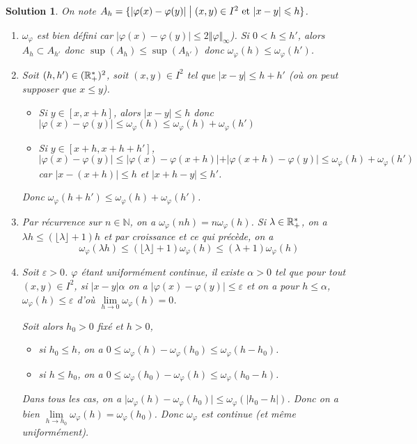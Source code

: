 \documentclass[12pt]{article}
\newtheorem{solution}{Solution}[section]
\theoremstyle{remark}
\newcommand{\N}{\mathbb{N}} \newcommand{\Z}{\mathbb{Z}}
\begin{document}
\begin{solution}
	On note $A_{h}=\{\vert\varphi(x)-\varphi(y)\vert\bigm|(x,y)\in I^{2}\text{ et }\vert x-y\vert\leqslant h\}$.
	\begin{enumerate}
		\item $\omega_{\varphi}$ est bien défini car $\vert\varphi(x)-\varphi(y)\vert\leqslant 2\Vert\varphi\Vert_{\infty}$). Si $0<h\leqslant h'$, alors $A_{h}\subset A_{h'}$ donc $\sup(A_{h})\leqslant\sup(A_{h'})$ donc $\omega_{\varphi}(h)\leqslant\omega_{\varphi}(h')$.
		\item Soit $(h,h')\in(\mathbb{R}_{+}^{*})^{2}$, soit $(x,y)\in I^{2}$ tel que $\vert x-y\vert\leqslant h+h'$ (où on peut supposer que $x\leqslant y$).
		\begin{itemize}
			\item Si $y\in[x,x+h]$, alors $\vert x-y\vert\leqslant h$ donc $\vert\varphi(x)-\varphi(y)\vert\leqslant\omega_{\varphi}(h)\leqslant\omega_\varphi(h)+\omega_{\varphi}(h')$
			\item Si $y\in[x+h,x+h+h']$, $\vert\varphi(x)-\varphi(y)\vert\leqslant\vert\varphi(x)-\varphi(x+h)\vert+\vert\varphi(x+h)-\varphi(y)\vert\leqslant\omega_\varphi(h)+\omega_{\varphi}(h')$ car $\vert x-(x+h)\vert\leqslant h$ et $\vert x+h-y\vert\leqslant h'$.
		\end{itemize}
		Donc $\omega_{\varphi}(h+h')\leqslant\omega_\varphi(h)+\omega_\varphi(h')$.
		\item Par récurrence sur $n\in\N$, on a $\omega_\varphi(nh)=n\omega_\varphi(h)$. Si $\lambda\in\mathbb{R}_{+}^{*}$, on a $\lambda h\leqslant(\lfloor \lambda\rfloor+1)h$ et par croissance et ce qui précède, on a 
		$$\omega_\varphi(\lambda h)\leqslant(\lfloor\lambda\rfloor+1)\omega_\varphi(h)\leqslant(\lambda+1)\omega_\varphi(h)$$
		\item Soit $\varepsilon>0$. $\varphi$ étant uniformément continue, il existe $\alpha>0$ tel que pour tout $(x,y)\in I^{2}$, si $\vert x-y\vert\alpha$ on a $\vert\varphi(x)-\varphi(y)\vert\leqslant\varepsilon$ et on a pour $h\leqslant\alpha$, $\omega_\varphi(h)\leqslant\varepsilon$ d'où $\lim\limits_{h\to0}\omega_\varphi(h)=0$.
		
		Soit alors $h_{0}>0$ fixé et $h>0$,
		\begin{itemize}
			\item si $h_{0}\leqslant h$, on a $0\leqslant\omega_\varphi(h)-\omega_\varphi(h_0)\leqslant\omega_\varphi(h-h_0)$.
			\item si $h\leqslant h_{0}$, on a $0\leqslant\omega_\varphi(h_0)-\omega_\varphi(h)\leqslant\omega_\varphi(h_0-h)$.
		\end{itemize}
		Dans tous les cas, on a $\vert\omega_\varphi(h)-\omega_\varphi(h_{0})\vert\leqslant\omega_\varphi(\vert h_{0}-h\vert)$. Donc on a bien $\lim\limits_{h\to h_{0}}\omega_\varphi(h)=\omega_\varphi(h_{0})$. Donc $\omega_{\varphi}$ est continue (et même uniformément).
	\end{enumerate}
\end{solution}
\end{document}
